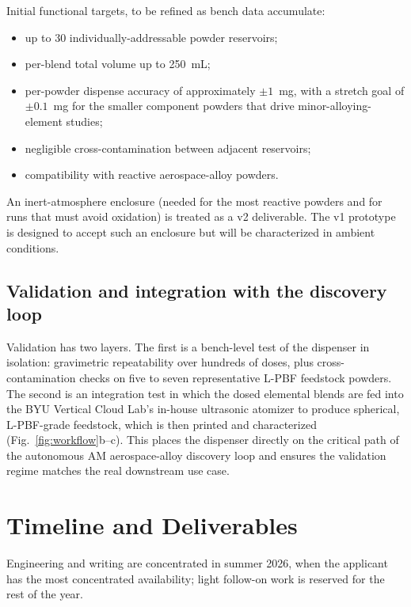 \documentclass[11pt]{article}
\begin{document}
Initial functional targets, to be refined as bench data accumulate:
\begin{itemize}[leftmargin=1.5em,itemsep=0.05em,topsep=0.1em]
  \item up to 30 individually-addressable powder reservoirs;
  \item per-blend total volume up to 250~mL;
  \item per-powder dispense accuracy of approximately $\pm 1$~mg, with
        a stretch goal of $\pm 0.1$~mg for the smaller component
        powders that drive minor-alloying-element studies;
  \item negligible cross-contamination between adjacent reservoirs;
  \item compatibility with reactive aerospace-alloy powders.
\end{itemize}
An inert-atmosphere enclosure (needed for the most reactive powders
and for runs that must avoid oxidation) is treated as a v2
deliverable.  The v1 prototype is designed to accept such an enclosure
but will be characterized in ambient conditions.

\subsection{Validation and integration with the discovery loop}

Validation has two layers.  The first is a bench-level test of the
dispenser in isolation: gravimetric repeatability over hundreds of
doses, plus cross-contamination checks on five to seven representative
L-PBF feedstock powders.  The second is an integration test in which
the dosed elemental blends are fed into the BYU Vertical Cloud Lab's
in-house ultrasonic atomizer to produce spherical, L-PBF-grade
feedstock, which is then printed and characterized
(Fig.~\ref{fig:workflow}b--c).  This places the dispenser directly on
the critical path of the autonomous AM aerospace-alloy discovery loop
and ensures the validation regime matches the real downstream use
case.

\section{Timeline and Deliverables}

Engineering and writing are concentrated in summer 2026, when the
applicant has the most concentrated availability; light follow-on work
is reserved for the rest of the year.
\end{document}
